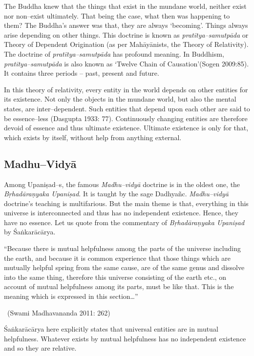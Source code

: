 The Buddha knew that the things that exist in the mundane world, neither exist nor non–exist ultimately. That being the case, what then was happening to them? The Buddha’s answer was that, they are always ‘becoming’. Things always arise depending on other things. This doctrine is known as \textit{pratītya–samutpāda} or Theory of Dependent Origination (as per Mahāyānists, the Theory of Relativity). The doctrine of \textit{pratītya–samutpāda} has profound meaning. In Buddhism, \textit{pratītya–samutpāda} is also known as ‘Twelve Chain of Causation’(Sogen 2009:85). It contains three periods – past, present and future.

In this theory of relativity, every entity in the world depends on other entities for its existence. Not only the objects in the mundane world, but also the mental states, are inter–dependent. Such entities that depend upon each other are said to be essence–less (Dasgupta 1933: 77). Continuously changing entities are therefore devoid of essence and thus ultimate existence. Ultimate existence is only for that, which exists by itself, without help from anything external.


\subsection*{Madhu–Vidyā}

Among Upaniṣad–s, the famous \textit{Madhu–vidyā} doctrine is in the oldest one, the \textit{Bṛhadāraṇyaka Upaniṣad}. It is taught by the sage Dadhyañc. \textit{Madhu–vidyā} doctrine’s teaching is multifarious. But the main theme is that, everything in this universe is interconnected and thus has no independent existence. Hence, they have no essence. Let us quote from the commentary of \textit{Bṛhadāraṇyaka Upaniṣad} by Śaṅkarācārya.

\begin{myquote}
“Because there is mutual helpfulness among the parts of the universe including the earth, and because it is common experience that those things which are mutually helpful spring from the same cause, are of the same genus and dissolve into the same thing, therefore this universe consisting of the earth etc., on account of mutual helpfulness among its parts, must be like that. This is the meaning which is expressed in this section…” 

~\hfill (Swami Madhavananda 2011: 262)
\end{myquote}

Śaṅkarācārya here explicitly states that universal entities are in mutual helpfulness. Whatever exists by mutual helpfulness has no independent existence and so they are relative.

